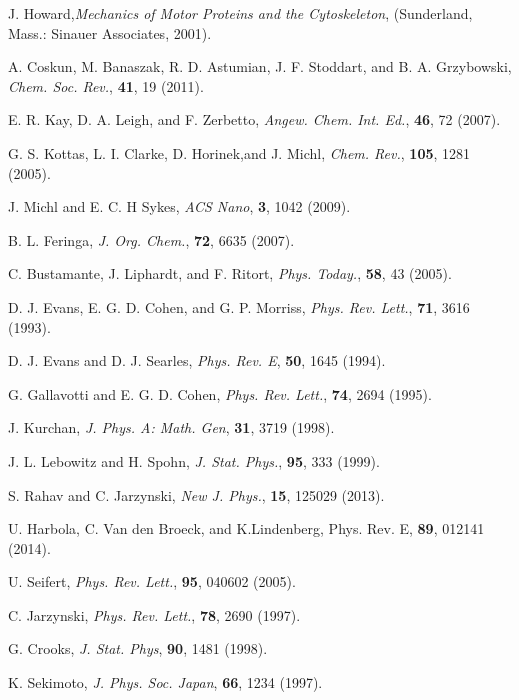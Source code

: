 \documentclass[aps,pre,showpacs,amsmath,amssymb,amsfonts,superscriptaddress,onecolumn,longbibliography]{revtex4-1}
\begin{document}
\begin{thebibliography}{99}
J. Howard,{\em Mechanics of Motor Proteins and the Cytoskeleton\/}, (Sunderland, Mass.: Sinauer Associates, 2001).

A. Coskun, M. Banaszak, R. D. Astumian, J. F. Stoddart, and B. A. Grzybowski, {\em
  Chem. Soc. Rev.\/}, {\bf 41}, 19 (2011).

E. R. Kay, D. A. Leigh, and F. Zerbetto, {\em Angew. Chem. Int.
  Ed.\/}, {\bf 46}, 72 (2007).

G. S. Kottas, L. I. Clarke, D. Horinek,and J. Michl, {\em Chem. Rev.\/}, {\bf 105},
  1281 (2005).

J. Michl and E. C. H Sykes, {\em {ACS} Nano\/}, {\bf 3}, 1042 (2009).

B. L. Feringa, {\em J. Org. Chem.\/}, {\bf 72}, 6635 (2007).

C. Bustamante, J. Liphardt, and F. Ritort, {\em Phys. Today.}, {\bf 58},  43
(2005).


D. J. Evans, E. G. D. Cohen, and G. P. Morriss, {\em Phys. Rev. Lett.}, {\bf
71},  3616 (1993).

D. J. Evans and D. J. Searles, {\em Phys. Rev. E}, {\bf 50},  1645 (1994).

G. Gallavotti and E. G. D. Cohen, {\em Phys. Rev. Lett.}, {\bf 74},  2694
(1995).

J. Kurchan, {\em J. Phys. A: Math. Gen}, {\bf 31},  3719 (1998).

J. L. Lebowitz and H. Spohn, {\em J. Stat. Phys.}, {\bf 95},  333 (1999).

S. Rahav and C. Jarzynski, {\em New J. Phys.}, {\bf 15}, 125029 (2013).

U. Harbola, C. Van den Broeck, and K.Lindenberg, Phys. Rev. E, {\bf 89}, 012141 (2014).

U. Seifert, {\em Phys. Rev. Lett.}, {\bf 95},  040602 (2005).

C. Jarzynski, {\em Phys. Rev. Lett.}, {\bf 78},  2690 (1997).

G. Crooks, {\em J. Stat. Phys}, {\bf 90},  1481 (1998).

K. Sekimoto, {\em J. Phys. Soc. Japan}, {\bf 66}, 1234 (1997).


\end{thebibliography}
\end{document}
